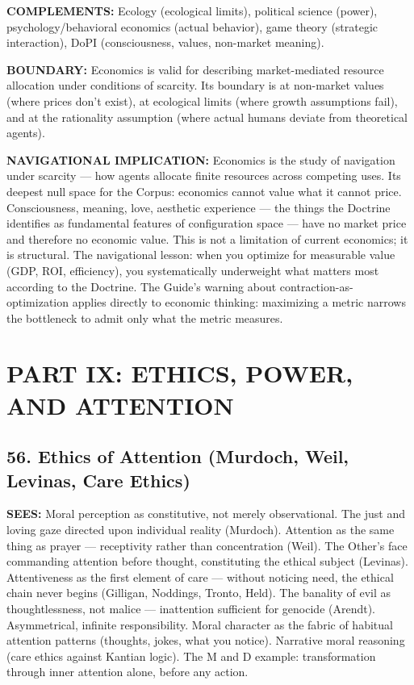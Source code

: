\textbf{COMPLEMENTS:} Ecology (ecological limits), political science (power), psychology/behavioral economics (actual behavior), game theory (strategic interaction), DoPI (consciousness, values, non-market meaning).


\textbf{BOUNDARY:} Economics is valid for describing market-mediated resource allocation under conditions of scarcity. Its boundary is at non-market values (where prices don't exist), at ecological limits (where growth assumptions fail), and at the rationality assumption (where actual humans deviate from theoretical agents).


\textbf{NAVIGATIONAL IMPLICATION:} Economics is the study of navigation under scarcity — how agents allocate finite resources across competing uses. Its deepest null space for the Corpus: economics cannot value what it cannot price. Consciousness, meaning, love, aesthetic experience — the things the Doctrine identifies as fundamental features of configuration space — have no market price and therefore no economic value. This is not a limitation of current economics; it is structural. The navigational lesson: when you optimize for measurable value (GDP, ROI, efficiency), you systematically underweight what matters most according to the Doctrine. The Guide's warning about contraction-as-optimization applies directly to economic thinking: maximizing a metric narrows the bottleneck to admit only what the metric measures.


\bigskip\noindent\makebox[\textwidth]{\color{rulegray}\rule{5cm}{0.3pt}}\bigskip


\chapter*{PART IX: ETHICS, POWER, AND ATTENTION}


\section*{56. Ethics of Attention (Murdoch, Weil, Levinas, Care Ethics)}


\textbf{SEES:} Moral perception as constitutive, not merely observational. The just and loving gaze directed upon individual reality (Murdoch). Attention as the same thing as prayer — receptivity rather than concentration (Weil). The Other's face commanding attention before thought, constituting the ethical subject (Levinas). Attentiveness as the first element of care — without noticing need, the ethical chain never begins (Gilligan, Noddings, Tronto, Held). The banality of evil as thoughtlessness, not malice — inattention sufficient for genocide (Arendt). Asymmetrical, infinite responsibility. Moral character as the fabric of habitual attention patterns (thoughts, jokes, what you notice). Narrative moral reasoning (care ethics against Kantian logic). The M and D example: transformation through inner attention alone, before any action.


